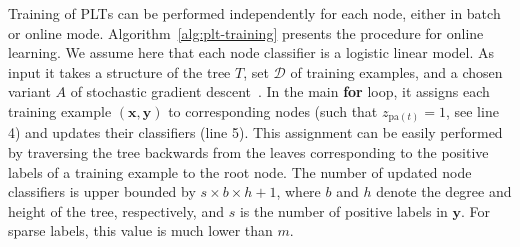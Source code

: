 \documentclass{article}
\newcommand{\Algo}[1]{\textsc{#1}}
\renewcommand{\vec}[1]{\boldsymbol{#1}}
\newcommand{\bx}{\vec{x}}
\newcommand{\by}{\vec{y}}
\newcommand{\calD}{\mathcal{D}}
\newcommand{\heta}{\hat{\eta}}
\newcommand{\pa}[1]{\mathrm{pa}(#1)}
\begin{document}
Training of \Algo{PLT}s can be performed independently for each node, either in batch or online mode.  Algorithm~\ref{alg:plt-training} presents the procedure for online learning. We assume here that each node classifier is a logistic linear model. As input it takes a structure of the tree $T$, set $\calD$ of training examples, and a chosen variant $A$ of stochastic gradient descent~\cite{Bottou_2010}. In the main \textbf{for} loop, it assigns each training example $(\bx, \by)$ to corresponding nodes (such that  $z_{\pa{t}} = 1$, see line 4) and updates their classifiers (line 5). This assignment can be easily performed by traversing the tree backwards from the leaves corresponding to the positive labels of a training example to the root node. The number of updated node classifiers is upper bounded by $s \times b \times h+1$, where $b$ and $h$ denote the degree and height of the tree, respectively, and $s$ is the number of positive labels in $\by$. For sparse labels, this value is much lower than $m$.





\end{document}
